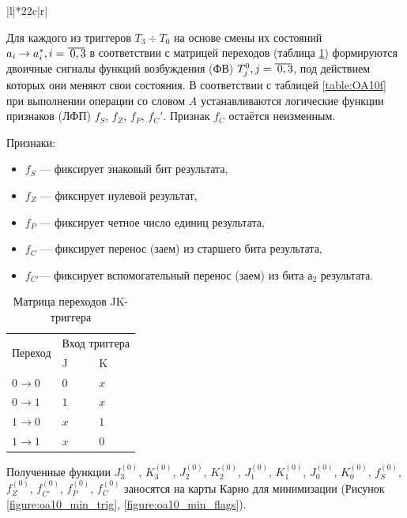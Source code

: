 \begin{landscape}
\begin{table}[H]
\begin{tabular}{|l|*{22}{c|}{r|}}
	\end{tabular}
\end{table}
\end{landscape}

Для каждого из триггеров $T_3 \div T_0$ на основе смены их состояний $a_i \rightarrow a^{*}_i, i=\oline{0,3}$ в соответствии с матрицей переходов (таблица \ref{table:JK_SMW}) формируются двоичные сигналы функций возбуждения (ФВ) $T^0_j, j=\oline{0,3}$, под действием которых они меняют свои состояния. В соответствии с таблицей \ref{table:OA10f} при выполнении операции со словом $A$ устанавливаются логические функции признаков (ЛФП) $f_S$, $f_Z$, $f_P$, $f_C'$. Признак $f_C$ остаётся неизменным.

Признаки:
\begin{itemize}
	\item $f_S$ --- фиксирует знаковый бит результата,
	\item $f_Z$ --- фиксирует нулевой результат,
	\item $f_P$ --- фиксирует четное число единиц результата,
	\item $f_C$ --- фиксирует перенос (заем) из старшего бита результата,
	\item $f_{C'}$---  фиксирует вспомогательный перенос (заем) из бита $а_2$ результата.
\end{itemize}

\begin{table}[H]
	\centering
	\caption{Матрица переходов JK-триггера}
	\label{table:JK_SMW}
	\begin{tabular}{| l | p{1cm} | p{1cm} |} \hline
		\multirow{2}{*}{Переход} & \multicolumn{2}{c|}{Вход триггера}\\ \cline{2-3}
		& J & K \\ \hline
		$0 \rightarrow 0$ & 	$0$ & $x$ \\ \hline
		$0 \rightarrow 1$ & 	$1$ & $x$ \\ \hline
		$1 \rightarrow 0$ & 	$x$ & $1$ \\ \hline
		$1 \rightarrow 1$ & 	$x$ & $0$ \\ \hline
	\end{tabular}
\end{table}

Полученные функции  $J^{(0)}_{3}$, $K^{(0)}_{3}$, $J^{(0)}_{2}$, $K^{(0)}_{2}$, $J^{(0)}_{1}$, $K^{(0)}_{1}$, $J^{(0)}_{0}$, $K^{(0)}_{0}$, $f^{(0)}_{S}$, $f^{(0)}_{Z}$, $f^{(0)}_{C'}$, $f^{(0)}_{P}$, $f^{(0)}_{C}$  заносятся на карты Карно для минимизации (Рисунок \ref{figure:oa10_min_trig}, \ref{figure:oa10_min_flags}).

